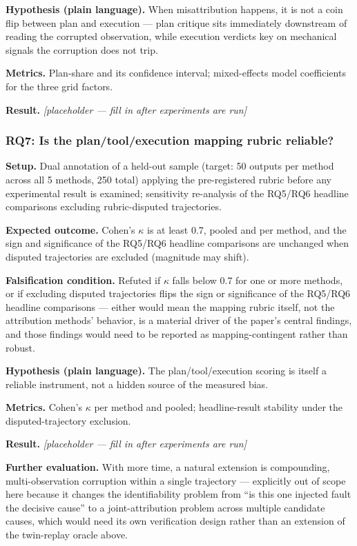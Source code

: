 \documentclass[11pt]{article}
\newcommand{\ph}{\textit{[placeholder --- fill in after experiments are run]}}
\begin{document}
\textbf{Hypothesis (plain language).} When misattribution happens, it is not a coin flip between plan and execution --- plan critique sits immediately downstream of reading the corrupted observation, while execution verdicts key on mechanical signals the corruption does not trip.

\textbf{Metrics.} Plan-share and its confidence interval; mixed-effects model coefficients for the three grid factors.

\textbf{Result.} \ph

\subsubsection{RQ7: Is the plan/tool/execution mapping rubric reliable?}
\textbf{Setup.} Dual annotation of a held-out sample (target: 50 outputs per method across all 5 methods, 250 total) applying the pre-registered rubric before any experimental result is examined; sensitivity re-analysis of the RQ5/RQ6 headline comparisons excluding rubric-disputed trajectories.

\textbf{Expected outcome.} Cohen's $\kappa$ is at least 0.7, pooled and per method, and the sign and significance of the RQ5/RQ6 headline comparisons are unchanged when disputed trajectories are excluded (magnitude may shift).

\textbf{Falsification condition.} Refuted if $\kappa$ falls below 0.7 for one or more methods, or if excluding disputed trajectories flips the sign or significance of the RQ5/RQ6 headline comparisons --- either would mean the mapping rubric itself, not the attribution methods' behavior, is a material driver of the paper's central findings, and those findings would need to be reported as mapping-contingent rather than robust.

\textbf{Hypothesis (plain language).} The plan/tool/execution scoring is itself a reliable instrument, not a hidden source of the measured bias.

\textbf{Metrics.} Cohen's $\kappa$ per method and pooled; headline-result stability under the disputed-trajectory exclusion.

\textbf{Result.} \ph

\vspace{0.5em}
\noindent\textbf{Further evaluation.} With more time, a natural extension is compounding, multi-observation corruption within a single trajectory --- explicitly out of scope here because it changes the identifiability problem from ``is this one injected fault the decisive cause'' to a joint-attribution problem across multiple candidate causes, which would need its own verification design rather than an extension of the twin-replay oracle above.
\end{document}
